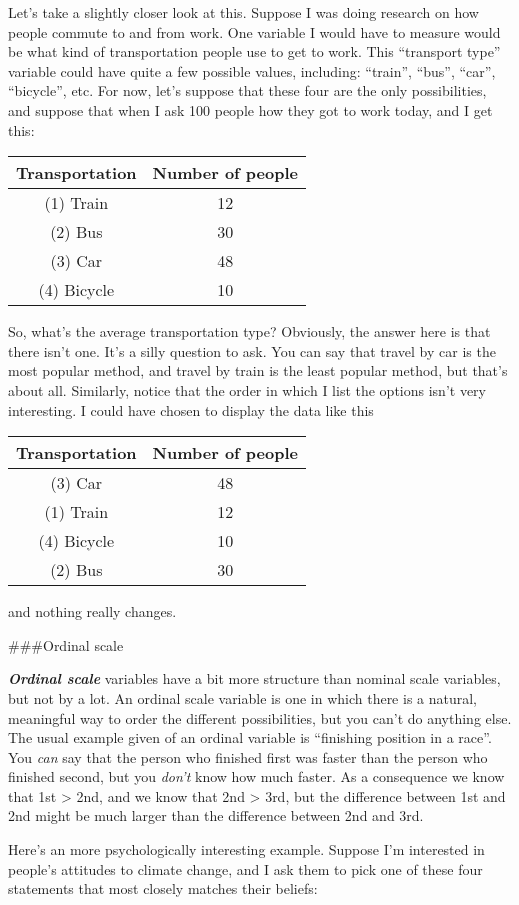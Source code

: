 \documentclass[]{book}
\begin{document}
Let's take a slightly closer look at this. Suppose I was doing research on how people commute to and from work. One variable I would have to measure would be what kind of transportation people use to get to work. This ``transport type'' variable could have quite a few possible values, including: ``train'', ``bus'', ``car'', ``bicycle'', etc. For now, let's suppose that these four are the only possibilities, and suppose that when I ask 100 people how they got to work today, and I get this:

\begin{longtable}[]{@{}cc@{}}
\toprule
Transportation & Number of people\tabularnewline
\midrule
\endhead
(1) Train & 12\tabularnewline
(2) Bus & 30\tabularnewline
(3) Car & 48\tabularnewline
(4) Bicycle & 10\tabularnewline
\bottomrule
\end{longtable}

So, what's the average transportation type? Obviously, the answer here is that there isn't one. It's a silly question to ask. You can say that travel by car is the most popular method, and travel by train is the least popular method, but that's about all. Similarly, notice that the order in which I list the options isn't very interesting. I could have chosen to display the data like this

\begin{longtable}[]{@{}cc@{}}
\toprule
Transportation & Number of people\tabularnewline
\midrule
\endhead
(3) Car & 48\tabularnewline
(1) Train & 12\tabularnewline
(4) Bicycle & 10\tabularnewline
(2) Bus & 30\tabularnewline
\bottomrule
\end{longtable}

and nothing really changes.

\#\#\#Ordinal scale

\textbf{\emph{Ordinal scale}} variables have a bit more structure than nominal scale variables, but not by a lot. An ordinal scale variable is one in which there is a natural, meaningful way to order the different possibilities, but you can't do anything else. The usual example given of an ordinal variable is ``finishing position in a race''. You \emph{can} say that the person who finished first was faster than the person who finished second, but you \emph{don't} know how much faster. As a consequence we know that 1st \textgreater{} 2nd, and we know that 2nd \textgreater{} 3rd, but the difference between 1st and 2nd might be much larger than the difference between 2nd and 3rd.

Here's an more psychologically interesting example. Suppose I'm interested in people's attitudes to climate change, and I ask them to pick one of these four statements that most closely matches their beliefs:
\end{document}

